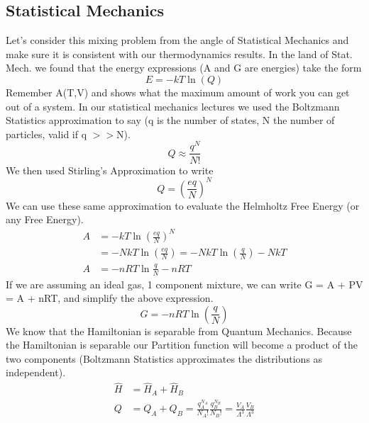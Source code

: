 \documentclass{article}
\begin{document}
\subsection*{Statistical Mechanics}
Let's consider this mixing problem from the angle of Statistical Mechanics and make sure it is consistent with our thermodynamics results. 
In the land of Stat. Mech. we found that the energy expressions (A and G are energies) take the form
\begin{equation}
    E = -kT\ln(Q)
\end{equation}
Remember A(T,V) and shows what the maximum amount of work you can get out of a system. 
In our statistical mechanics lectures we used the Boltzmann Statistics approximation to say (q is the number of states, N the number of particles, valid if q 
$>>$N).
\begin{equation}
    Q \approx \frac{q^N}{N!}
\end{equation}
We then used Stirling's Approximation to write
\begin{equation}
    Q = \left(\frac{eq}{N}\right)^N
\end{equation}
We can use these same approximation to evaluate the Helmholtz Free Energy (or any Free Energy). 
\begin{equation}
\begin{split}
    A &= -kT \ln\left(\frac{eq}{N}\right)^N \\
    &= -NkT \ln\left(\frac{eq}{N}\right) = -NkT \ln\left(\frac{q}{N}\right) - NkT \\
    A &= -nRT \ln\frac{q}{N} - nRT
\end{split}
\end{equation}
If we are assuming an ideal gas, 1 component mixture, we can write G = A + PV = A + nRT, and simplify the above expression. 
\begin{equation}
G = -nRT\ln\left(\frac{q}{N}\right)
\end{equation}
We know that the Hamiltonian is separable from Quantum Mechanics.
Because the Hamiltonian is separable our Partition function will become a product of the two components (Boltzmann Statistics approximates the distributions as independent). 
\begin{equation}
    \begin{split}
        \hat{H} &= \hat{H}_A + \hat{H}_B \\
        Q &= Q_A + Q_B = \frac{q_A^{N_A}}{N_A!}\frac{q_B^{N_B}}{N_B!} = \frac{V_A}{\Lambda^3}\frac{V_B}{\Lambda^3}
    \end{split}
\end{equation}
\end{document}
